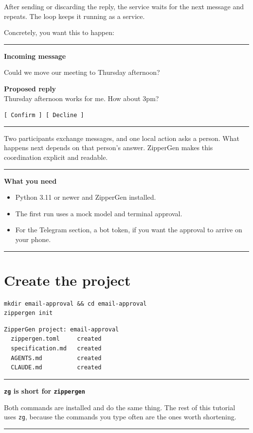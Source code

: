 \documentclass[11pt,a4paper]{article}
\newenvironment{notebox}[1]
{\begin{center}\begin{minipage}{0.94\linewidth}
 \color{ZipperInk}\hrule\vspace{5pt}\textbf{#1}\par\smallskip}
{\vspace{5pt}\hrule\end{minipage}\end{center}}
\begin{document}
After sending or discarding the reply, the service waits for the next message
and repeats. The loop keeps it running as a service.

Concretely, you want this to happen:

\begin{notebox}{Incoming message}
Could we move our meeting to Thursday afternoon?

\smallskip
\textbf{Proposed reply}\\
Thursday afternoon works for me. How about 3pm?

\smallskip
\texttt{[ Confirm ] [ Decline ]}
\end{notebox}

Two participants exchange messages, and one local action asks a person. What
happens next depends on that person's answer. ZipperGen makes this coordination
explicit and readable.

\begin{notebox}{What you need}
\begin{itemize}
  \item Python 3.11 or newer and ZipperGen installed.
  \item The first run uses a mock model and terminal approval.
  \item For the Telegram section, a bot token, if you want the approval to
        arrive on your phone.
\end{itemize}
\end{notebox}

\section{Create the project}

\begin{lstlisting}[style=shell]
mkdir email-approval && cd email-approval
zippergen init
\end{lstlisting}

\begin{lstlisting}
ZipperGen project: email-approval
  zippergen.toml     created
  specification.md   created
  AGENTS.md          created
  CLAUDE.md          created
\end{lstlisting}

\begin{notebox}{\texttt{zg} is short for \texttt{zippergen}}
Both commands are installed and do the same thing. The rest of this tutorial
uses \texttt{zg}, because the commands you type often are the ones worth
shortening.
\end{notebox}
\end{document}

